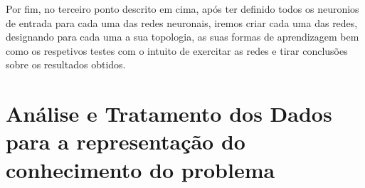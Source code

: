 \documentclass{report}
\begin{document}
Por fim, no terceiro ponto descrito em cima, após ter definido todos os neuronios de entrada para cada uma das redes neuronais, iremos criar cada uma das redes, designando para cada uma a sua topologia, as suas formas de aprendizagem bem como os respetivos testes com o intuito de exercitar as redes e tirar conclusões sobre os resultados obtidos.


















\chapter{Análise e Tratamento dos Dados para a representação do conhecimento do problema}
\end{document}
